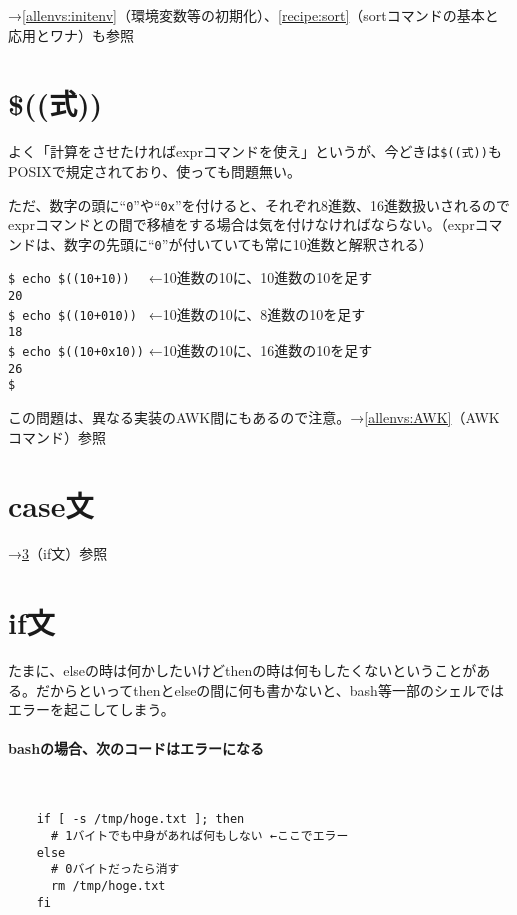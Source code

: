 \noindent
→\ref{allenvs:initenv}（環境変数等の初期化）、\ref{recipe:sort}（sortコマンドの基本と応用とワナ）も参照

\section{\$((式))}

よく「計算をさせたければexprコマンドを使え」というが、今どきは\verb|$((式))|もPOSIXで規定されており、使っても問題無い。

ただ、数字の頭に``\verb|0|''や``\verb|0x|''を付けると、それぞれ8進数、16進数扱いされるのでexprコマンドとの間で移植をする場合は気を付けなければならない。（exprコマンドは、数字の先頭に``\verb|0|''が付いていても常に10進数と解釈される）

\begin{screen}
	\verb|$ echo $((10+10))| \return \verb|  |←10進数の10に、10進数の10を足す \\
	\verb|20| \\
	\verb|$ echo $((10+010))| \return \verb| |←10進数の10に、8進数の10を足す \\
	\verb|18| \\
	\verb|$ echo $((10+0x10))| \return ←10進数の10に、16進数の10を足す \\
	\verb|26| \\
	\verb|$ |
\end{screen}

この問題は、異なる実装のAWK間にもあるので注意。→\ref{allenvs:AWK}（AWKコマンド）参照

\section{case文}

\noindent
→\ref{allenvs:if}（if文）参照

\section{if文}
\label{allenvs:if}

たまに、elseの時は何かしたいけどthenの時は何もしたくないということがある。だからといってthenとelseの間に何も書かないと、bash等一部のシェルではエラーを起こしてしまう。

\paragraph{bashの場合、次のコードはエラーになる} 　\\
\begin{frameboxit}{160.0mm}
\begin{verbatim}
	if [ -s /tmp/hoge.txt ]; then
	  # 1バイトでも中身があれば何もしない ←ここでエラー
	else
	  # 0バイトだったら消す
	  rm /tmp/hoge.txt
	fi
\end{verbatim}
\end{frameboxit}

